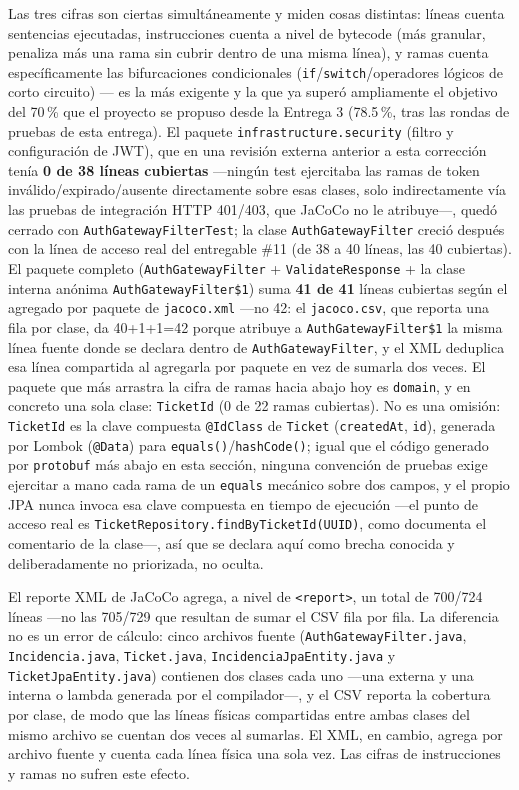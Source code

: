 Las tres cifras son ciertas simultáneamente y miden cosas distintas: líneas cuenta sentencias
ejecutadas, instrucciones cuenta a nivel de bytecode (más granular, penaliza más una rama sin
cubrir dentro de una misma línea), y ramas cuenta específicamente las bifurcaciones
condicionales (\texttt{if}/\texttt{switch}/operadores lógicos de corto circuito) — es la más
exigente y la que ya superó ampliamente el objetivo del 70\,\% que el proyecto se propuso desde
la Entrega 3 (78.5\,\%, tras las rondas de pruebas de esta entrega). El paquete
\texttt{infrastructure.security} (filtro y configuración de JWT), que en una revisión externa
anterior a esta corrección tenía \textbf{0 de 38 líneas cubiertas} —ningún test ejercitaba las
ramas de token inválido/expirado/ausente directamente sobre esas clases, solo indirectamente vía
las pruebas de integración HTTP 401/403, que JaCoCo no le atribuye—, quedó cerrado con
\texttt{AuthGatewayFilterTest}; la clase \texttt{AuthGatewayFilter} creció después con la línea
de acceso real del entregable \#11 (de 38 a 40 líneas, las 40 cubiertas). El paquete completo
(\texttt{AuthGatewayFilter} + \texttt{ValidateResponse} + la clase interna anónima
\texttt{AuthGatewayFilter\$1}) suma \textbf{41 de 41} líneas cubiertas según el agregado por
paquete de \texttt{jacoco.xml} —no 42: el \texttt{jacoco.csv}, que reporta una fila por clase, da
40+1+1=42 porque atribuye a \texttt{AuthGatewayFilter\$1} la misma línea fuente donde se declara
dentro de \texttt{AuthGatewayFilter}, y el XML deduplica esa línea compartida al agregarla por
paquete en vez de sumarla dos veces. El paquete que más arrastra la
cifra de ramas hacia abajo hoy es \texttt{domain}, y en concreto una sola clase:
\texttt{TicketId} (0 de 22 ramas cubiertas). No es una omisión: \texttt{TicketId} es la clave
compuesta \texttt{@IdClass} de \texttt{Ticket} (\texttt{createdAt}, \texttt{id}), generada por
Lombok (\texttt{@Data}) para \texttt{equals()}/\texttt{hashCode()}; igual que el código generado
por \texttt{protobuf} más abajo en esta sección, ninguna convención de pruebas exige ejercitar a
mano cada rama de un \texttt{equals} mecánico sobre dos campos, y el propio JPA nunca invoca esa
clave compuesta en tiempo de ejecución —el punto de acceso real es
\texttt{TicketRepository.findByTicketId(UUID)}, como documenta el comentario de la clase—, así
que se declara aquí como brecha conocida y deliberadamente no priorizada, no oculta.

El reporte XML de JaCoCo agrega, a nivel de \texttt{<report>}, un total de 700/724 líneas —no
las 705/729 que resultan de sumar el CSV fila por fila. La diferencia no es un error de cálculo:
cinco archivos fuente (\texttt{AuthGatewayFilter.java}, \texttt{Incidencia.java},
\texttt{Ticket.java}, \texttt{IncidenciaJpaEntity.java} y \texttt{TicketJpaEntity.java}) contienen
dos clases cada uno —una externa y una interna o lambda generada por el compilador—, y el CSV
reporta la cobertura por clase, de modo que las líneas físicas compartidas entre ambas clases del
mismo archivo se cuentan dos veces al sumarlas. El XML, en cambio, agrega por archivo fuente y
cuenta cada línea física una sola vez. Las cifras de instrucciones y ramas no sufren este efecto.


